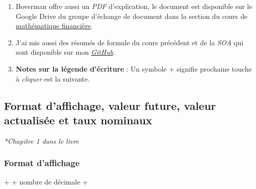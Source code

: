 \begin{enumerate}
\item Boverman offre aussi un \emph{PDF} d'explication, le document est disponible sur le Google Drive du groupe d'échange de document dans la section du cours de \href{https://drive.google.com/open?id=0B6kXivc6X9LITmdBVFVWSDAxeE0}{mathématique financière}.
\item J'ai mis aussi des résumés de formule du cours précédent et de la \emph{SOA} qui sont disponible sur mon \href{https://rawgit.com/davebulaval/Study_material_act/master/Résumé\%20FM/ResumeFM_ASM10e.pdf}{\emph{GitHub}}.
\item \textbf{Notes sur la légende d'écriture} : 
Un symbole + signifie prochaine touche à \textit{cliquer} est la suivante.

\end{enumerate}

\subsection{Format d'affichage, valeur future, valeur actualisée et taux nominaux}

\textit{*Chapitre 1 dans le livre}

\subsubsection{Format d'affichage}
 +  + nombre de décimale + 

